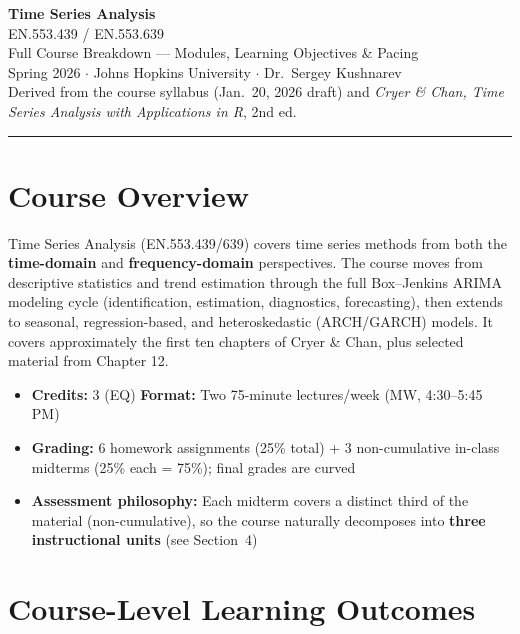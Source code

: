 \documentclass[11pt]{article}
\begin{document}
\begin{center}
  {\Huge\bfseries\color{jhublue} Time Series Analysis}\\[0.3em]
  {\Large EN.553.439 / EN.553.639}\\[0.2em]
  {\large Full Course Breakdown --- Modules, Learning Objectives \& Pacing}\\[0.4em]
  {\normalsize Spring 2026 \(\cdot\) Johns Hopkins University \(\cdot\) Dr.\ Sergey Kushnarev}\\[0.1em]
  {\small Derived from the course syllabus (Jan.\ 20, 2026 draft) and \emph{Cryer \& Chan, Time Series
  Analysis with Applications in R}, 2nd ed.}
\end{center}

\vspace{0.6em}
\hrule
\vspace{1em}

\section{Course Overview}

Time Series Analysis (EN.553.439/639) covers time series methods from both the \textbf{time-domain}
and \textbf{frequency-domain} perspectives. The course moves from descriptive statistics and trend
estimation through the full Box--Jenkins ARIMA modeling cycle (identification, estimation,
diagnostics, forecasting), then extends to seasonal, regression-based, and heteroskedastic
(ARCH/GARCH) models. It covers approximately the first ten chapters of Cryer \& Chan, plus selected
material from Chapter 12.

\begin{itemize}
  \item \textbf{Credits:} 3 (EQ) \qquad \textbf{Format:} Two 75-minute lectures/week (MW, 4:30--5:45 PM)
  \item \textbf{Grading:} 6 homework assignments (25\% total) + 3 non-cumulative in-class midterms
        (25\% each = 75\%); final grades are curved
  \item \textbf{Assessment philosophy:} Each midterm covers a distinct third of the material
        (non-cumulative), so the course naturally decomposes into \textbf{three instructional units}
        (see Section~4)
\end{itemize}

\section{Course-Level Learning Outcomes}
\end{document}
